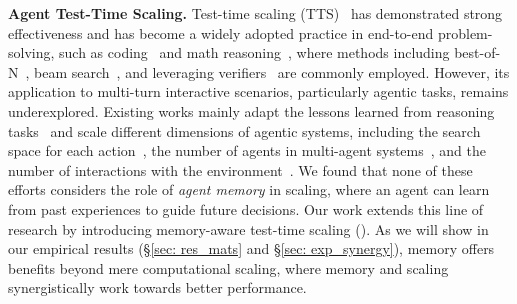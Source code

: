 \noindent\textbf{Agent Test-Time Scaling.}
Test-time scaling (TTS)~\citep{snell2025scaling} has demonstrated strong effectiveness and has become a widely adopted practice in end-to-end problem-solving, such as coding~\citep{li2025s, yu2025z1} and math reasoning~\citep{muennighoff2025s1}, where methods including best-of-N~\citep{chow2025inferenceaware}, beam search~\citep{wu2024inference}, and leveraging verifiers~\citep{setlur2025scaling} are commonly employed. 
However, its application to multi-turn interactive scenarios, particularly agentic tasks, remains underexplored. Existing works mainly adapt the lessons learned from reasoning tasks~\citep{zhu2025scaling} and scale different dimensions of agentic systems, including the search space for each action~\citep{yu2025exact}, the number of agents in multi-agent systems~\citep{jin2025two}, and the number of interactions with the environment~\citep{shen2025thinking}. We found that none of these efforts considers the role of \textit{agent memory} in scaling, where an agent can learn from past experiences to guide future decisions. Our work extends this line of research by introducing memory-aware test-time scaling (\mats{}). As we will show in our empirical results (\S\ref{sec: res_mats} and \S\ref{sec: exp_synergy}), memory offers benefits beyond mere computational scaling, where memory and scaling synergistically work towards better performance.